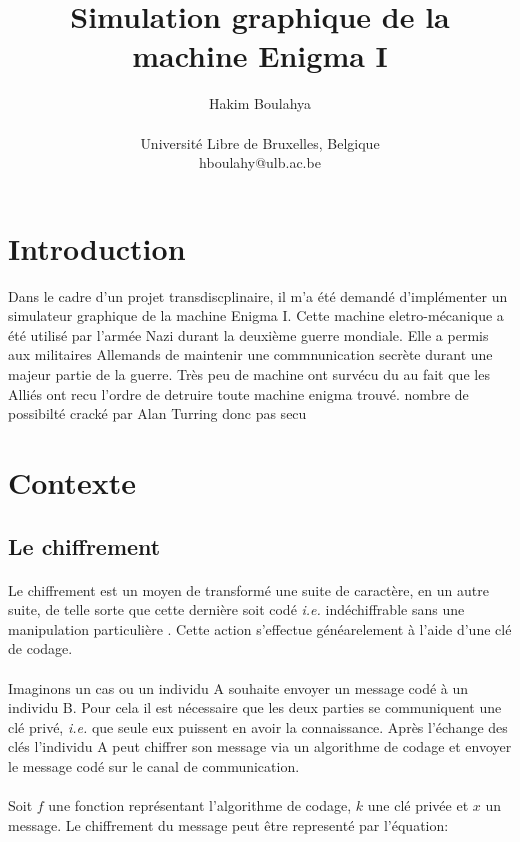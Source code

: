 \documentclass[letterpaper]{article}
\title{Simulation graphique de la machine Enigma I}
\author{Hakim Boulahya \\
\mbox{}\\
Université Libre de Bruxelles, Belgique\\
hboulahy@ulb.ac.be}
\begin{document}
\maketitle

\begin{abstract}
\end{abstract}

\section{Introduction}
Dans le cadre d'un projet transdiscplinaire, il m'a été demandé d'implémenter
un simulateur graphique de la machine Enigma I. Cette machine eletro-mécanique a été utilisé par
l'armée Nazi durant la deuxième guerre mondiale. Elle a permis aux militaires Allemands
de maintenir une commnunication secrète durant une majeur partie de la guerre. Très peu
de machine ont survécu du au fait que les Alliés ont recu l'ordre de detruire toute machine
enigma trouvé.
nombre de possibilté
cracké par Alan Turring donc pas secu

\section{Contexte}

\subsection{Le chiffrement}

\paragraph{}
Le chiffrement est un moyen de transformé une suite de caractère, en un autre suite, de telle sorte
que cette dernière soit codé \textit{i.e.} indéchiffrable sans une manipulation particulière \citep{MCEE}.
Cette action s'effectue généarelement à l'aide
d'une clé de codage. 
 \paragraph{}
Imaginons un cas ou un individu A souhaite envoyer un message codé à un individu
B. Pour cela il est nécessaire que les deux parties se communiquent une clé privé, \textit{i.e.} que seule
eux puissent en avoir la connaissance. Après l'échange des clés l'individu A peut chiffrer son message
via un algorithme de codage et envoyer le message codé sur le canal de communication.
\paragraph{}
Soit $f$ une
fonction représentant l'algorithme de codage, $k$ une clé privée et $x$ un message.
Le chiffrement du message peut être representé par l'équation:
\end{document}

